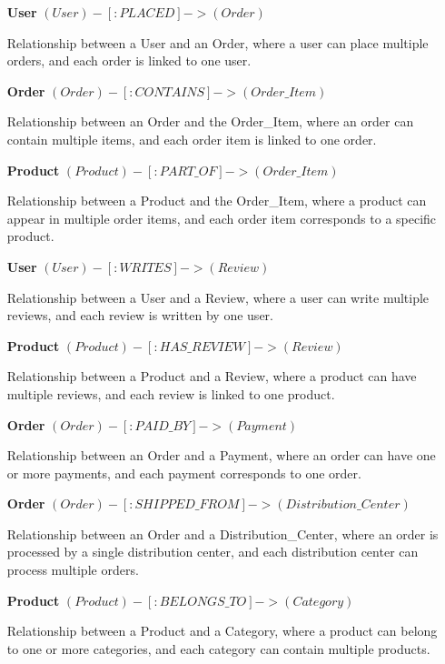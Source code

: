 \documentclass[a4paper,12pt]{article}
\begin{document}
    \begin{itemize}[noitemsep]
      
        \item[\textbf{User}] $(User)-[:PLACED]->(Order)$
        
        Relationship between a User and an Order, where a user can place multiple orders, and each order is linked to one user.
        
        \item[\textbf{Order}] $(Order)-[:CONTAINS]->(Order\_Item)$
        
        Relationship between an Order and the Order\_Item, where an order can contain multiple items, and each order item is linked to one order.
        
        \item[\textbf{Product}] $(Product)-[:PART\_OF]->(Order\_Item)$
        
        Relationship between a Product and the Order\_Item, where a product can appear in multiple order items, and each order item corresponds to a specific product.
        
        \item[\textbf{User}] $(User)-[:WRITES]->(Review)$
        
        Relationship between a User and a Review, where a user can write multiple reviews, and each review is written by one user.
        
        \item[\textbf{Product}] $(Product)-[:HAS\_REVIEW]->(Review)$
        
        Relationship between a Product and a Review, where a product can have multiple reviews, and each review is linked to one product.
        
        \item[\textbf{Order}] $(Order)-[:PAID\_BY]->(Payment)$
        
        Relationship between an Order and a Payment, where an order can have one or more payments, and each payment corresponds to one order.
        
        \item[\textbf{Order}] $(Order)-[:SHIPPED\_FROM]->(Distribution\_Center)$
        
        Relationship between an Order and a Distribution\_Center, where an order is processed by a single distribution center, and each distribution center can process multiple orders.
        
        \item[\textbf{Product}] $(Product)-[:BELONGS\_TO]->(Category)$
        
        Relationship between a Product and a Category, where a product can belong to one or more categories, and each category can contain multiple products.
        
    \end{itemize}
    
\end{document}
